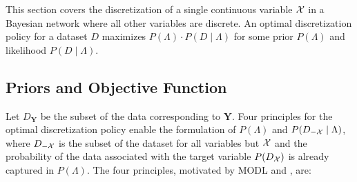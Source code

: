 This section covers the discretization of a single continuous variable $\mathcal{X}$ in a Bayesian network where all other variables are discrete.
An optimal discretization policy for a dataset $D$ maximizes $P(\Lambda)\cdot P(D\mid \Lambda)$ for some prior $P(\Lambda)$ and likelihood $P(D\mid \Lambda)$.





\subsection{Priors and Objective Function}

Let $D_{\bm{Y}}$ be the subset of the data corresponding to $\bm{Y}$.
Four principles for the optimal discretization policy enable the formulation of $P(\Lambda)$ and $P(D_{-\mathcal{X}} \mid \Lambda)$, where $D_{-\mathcal{X}}$ is the subset of the dataset for all variables but $\mathcal{X}$ and the probability of the data associated with the target variable $P(D_{\mathcal{X}})$ is already captured in $P(\Lambda)$.
The four principles, motivated by MODL and \cite{Lustgarten_2011}, are:

